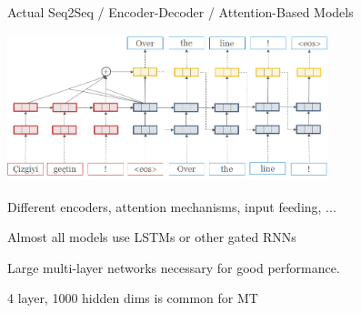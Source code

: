 \documentclass{beamer}
\let\tempone\itemize
\let\temptwo\enditemize
\renewenvironment{itemize}{\tempone\addtolength{\itemsep}{0.5\baselineskip}}{\temptwo}
\newcommand{\air}{\vspace{0.25cm}}
\newcommand{\wvec}{\mathbf{w}}
\newcommand{\cvec}{\mathbf{c}}
\begin{document}
\begin{frame}
  \begin{center}
    Actual Seq2Seq / Encoder-Decoder / Attention-Based Models
  \end{center}
    \begin{center}
      \includegraphics[width=0.7\textwidth]{simple-attn}
    \end{center}
  \begin{itemize}
  \item Different encoders, attention mechanisms, input feeding, ...
    \air
  \item Almost all models use LSTMs or other gated RNNs 
    \air
  \item Large multi-layer networks  necessary for good performance.
    \begin{itemize}
    \item 4 layer, 1000 hidden dims is common for MT
    \end{itemize}
  \end{itemize}
\end{frame}
\end{document}
